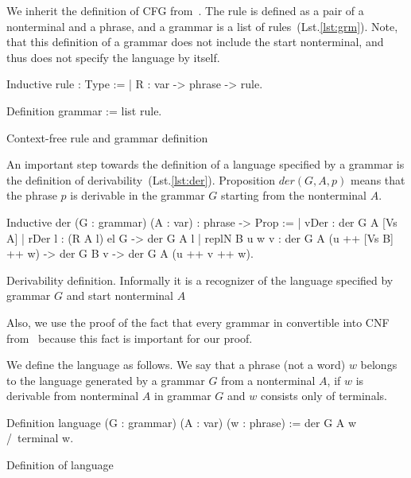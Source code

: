 We inherit the definition of CFG from~\cite{smolkaHofmann2016}. The rule is defined as a pair of a nonterminal and a phrase, and a grammar is a list of rules~(Lst.\ref{lst:grm}).
Note, that this definition of a grammar does not include the start nonterminal, and thus does not specify the language by itself.

\begin{listing}[h]
    \begin{pyglist}[language=coq, numbers=none, numbersep=5pt]
  Inductive rule : Type := | R : var -> phrase -> rule.
        
  Definition grammar := list rule.
    \end{pyglist}
    \caption{Context-free rule and grammar definition}
    \label{lst:grm}
\end{listing}

An important step towards the definition of a language specified by a grammar is the definition of derivability~(Lst.\ref{lst:der}). Proposition $der(G, A, p)$ means that the phrase $p$ is derivable in the grammar $G$ starting from the nonterminal $A$.

\begin{listing}[h]
    \begin{pyglist}[language=coq, numbers=none, numbersep=5pt]
  Inductive der (G : grammar) 
                (A : var) : phrase -> Prop :=
  | vDer : der G A [Vs A]
  | rDer l : (R A l) el G -> der G A l
  | replN B u w v : 
      der G A (u ++ [Vs B] ++ w) -> 
      der G B v -> der G A (u ++ v ++ w).
    \end{pyglist}
    \caption{Derivability definition. Informally it is a recognizer of the language specified by grammar $G$ and start nonterminal $A$}
    \label{lst:der}
\end{listing}

Also, we use the proof of the fact that every grammar in convertible into CNF from~\cite{smolkaHofmann2016} because this fact is important for our proof.

We define the language as follows. We say that a phrase (not a word) $ w $ belongs to the language generated by a grammar $G$ from a nonterminal $A$, if $ w $ is derivable from nonterminal $ A $ in grammar $ G $ and $ w $ consists only of terminals.

\begin{listing}[h]
	\begin{pyglist}[language=coq, numbers=none, numbersep=5pt]
  Definition language
             (G : grammar)
             (A : var)
             (w : phrase) :=
    der G A w /\ terminal w.
	\end{pyglist}
	\caption{Definition of language}
	\label{lst:lang}
\end{listing}



